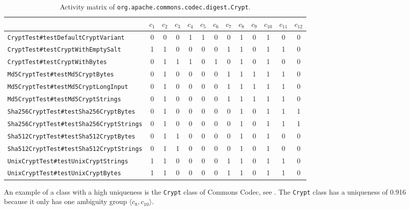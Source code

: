 \documentclass[twoside,a4paper,11pt]{memoir}
\begin{document}
\begin{table}[]
\scriptsize
\centering
\caption{Activity matrix of \texttt{org.apache.commons.codec.digest.Crypt}.}
\label{tab:crypt}
\begin{adjustbox}{center}
\begin{tabular}{l|cccccccccccc}
 & $c_1$ & $c_2$ & $c_3$ & $c_4$ & $c_5$ & $c_6$ & $c_7$ & $c_8$ & $c_9$ & $c_{10}$ & $c_{11}$ & $c_{12}$ \\ \hline
\texttt{CryptTest\#testDefaultCryptVariant} & 0 & 0 & 0 & 1 & 1 & 0 & 0 & 1 & 0 & 1 & 0 & 0 \\
\texttt{CryptTest\#testCryptWithEmptySalt} & 1 & 1 & 0 & 0 & 0 & 0 & 1 & 1 & 0 & 1 & 1 & 0 \\
\texttt{CryptTest\#testCryptWithBytes} & 0 & 1 & 1 & 1 & 0 & 1 & 0 & 1 & 0 & 1 & 0 & 0 \\
\texttt{Md5CryptTest\#testMd5CryptBytes} & 0 & 1 & 0 & 0 & 0 & 0 & 1 & 1 & 1 & 1 & 1 & 0 \\
\texttt{Md5CryptTest\#testMd5CryptLongInput} & 0 & 1 & 0 & 0 & 0 & 0 & 1 & 1 & 1 & 1 & 1 & 0 \\
\texttt{Md5CryptTest\#testMd5CryptStrings} & 0 & 1 & 0 & 0 & 0 & 0 & 1 & 1 & 1 & 1 & 1 & 0 \\
\texttt{Sha256CryptTest\#testSha256CryptBytes} & 0 & 1 & 0 & 0 & 0 & 0 & 0 & 1 & 0 & 1 & 1 & 1 \\
\texttt{Sha256CryptTest\#testSha256CryptStrings} & 0 & 1 & 0 & 0 & 0 & 0 & 0 & 1 & 0 & 1 & 1 & 1 \\
\texttt{Sha512CryptTest\#testSha512CryptBytes} & 0 & 1 & 1 & 0 & 0 & 0 & 0 & 1 & 0 & 1 & 0 & 0 \\
\texttt{Sha512CryptTest\#testSha512CryptStrings} & 0 & 1 & 1 & 0 & 0 & 0 & 0 & 1 & 0 & 1 & 0 & 0 \\
\texttt{UnixCryptTest\#testUnixCryptStrings} & 1 & 1 & 0 & 0 & 0 & 0 & 1 & 1 & 0 & 1 & 1 & 0 \\
\texttt{UnixCryptTest\#testUnixCryptBytes} & 1 & 1 & 0 & 0 & 0 & 0 & 1 & 1 & 0 & 1 & 1 & 0
\end{tabular}
\end{adjustbox}
\end{table}

An example of a class with a high uniqueness is the \texttt{Crypt} class of Commons Codec, see .
The \texttt{Crypt} class has a uniqueness of 0.916 because it only has one ambiguity group $\langle c_8, c_{10} \rangle$.
\end{document}
